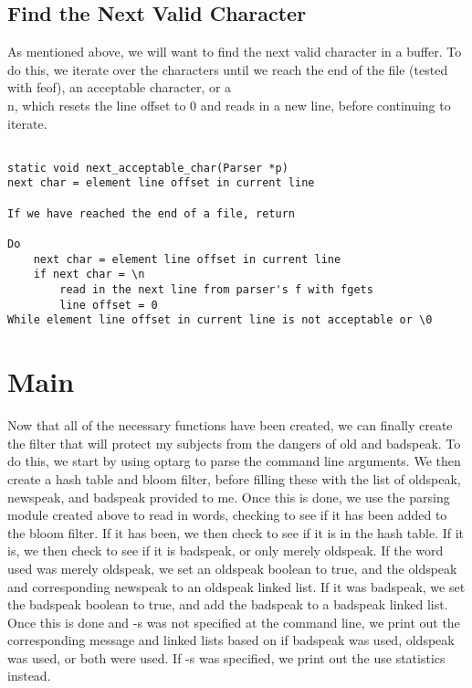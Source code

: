 \documentclass[11pt]{article}
\begin{document}
\subsection{Find the Next Valid Character}

As mentioned above, we will want to find the next valid character in a buffer. To do this, we iterate over the characters until we reach the end of the file (tested with feof), an acceptable character, or a \\n, which resets the line offset to 0 and reads in a new line, before continuing to iterate.

\begin{verbatim}

static void next_acceptable_char(Parser *p)
next char = element line offset in current line

If we have reached the end of a file, return

Do
    next char = element line offset in current line
    if next char = \n
        read in the next line from parser's f with fgets
        line offset = 0
While element line offset in current line is not acceptable or \0

\end{verbatim}

\section{Main}

Now that all of the necessary functions have been created, we can finally create the filter that will protect my subjects from the dangers of old and badspeak. To do this, we start by using optarg to parse the command line arguments. We then create a hash table and bloom filter, before filling these with the list of oldspeak, newspeak, and badspeak provided to me. Once this is done, we use the parsing module created above to read in words, checking to see if it has been added to the bloom filter. If it has been, we then check to see if it is in the hash table. If it is, we then check to see if it is badspeak, or only merely oldspeak. If the word used was merely oldspeak, we set an oldspeak boolean to true, and the oldspeak and corresponding newspeak to an oldspeak linked list. If it was badspeak, we set the badspeak boolean to true, and add the badspeak to a badspeak linked list. Once this is done and -s was not specified at the command line, we print out 
the corresponding message and linked lists based on if badspeak was used, oldspeak was used, or both were used. If -s was specified, we print out the use statistics instead.
\end{document}
